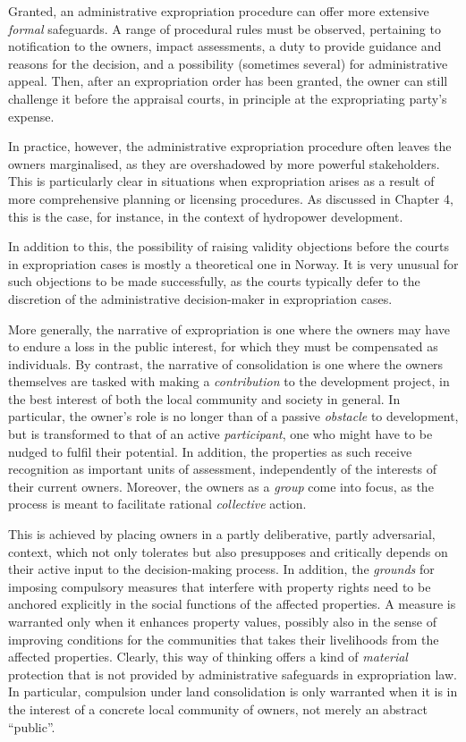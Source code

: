 Granted, an administrative expropriation procedure can offer more extensive {\it formal} safeguards. A range of procedural rules must be observed, pertaining to notification to the owners, impact assessments, a duty to provide guidance and reasons for the decision, and a possibility (sometimes several) for administrative appeal. Then, after an expropriation order has been granted, the owner can still challenge it before the appraisal courts, in principle at the expropriating party's expense. 

In practice, however, the administrative expropriation procedure often leaves the owners marginalised, as they are overshadowed by more powerful stakeholders. This is particularly clear in situations when expropriation arises as a result of more comprehensive planning or licensing procedures. As discussed in Chapter 4, this is the case, for instance, in the context of hydropower development. 

In addition to this, the possibility of raising validity objections before the courts in expropriation cases is mostly a theoretical one in Norway. It is very unusual for such objections to be made successfully, as the courts typically defer to the discretion of the administrative decision-maker in expropriation cases.

More generally, the narrative of expropriation is one where the owners may have to endure a loss in the public interest, for which they must be compensated as individuals. By contrast, the narrative of consolidation is one where the owners themselves are tasked with making a {\it contribution} to the development project, in the best interest of both the local community and society in general. In particular, the owner's role is no longer than of a passive {\it obstacle} to development, but is transformed to that of an active {\it participant}, one who might have to be nudged to fulfil their potential. In addition, the properties as such receive recognition as important units of assessment, independently of the interests of their current owners. Moreover, the owners as a {\it group} come into focus, as the process is meant to facilitate rational {\it collective} action.

This is achieved by placing owners in a partly deliberative, partly adversarial, context, which not only tolerates but also presupposes and critically depends on their active input to the decision-making process. In addition, the {\it grounds} for imposing compulsory measures that interfere with property rights need to be anchored explicitly in the social functions of the affected properties. A measure is warranted only when it enhances property values, possibly also in the sense of improving conditions for the communities that takes their livelihoods from the affected properties. Clearly, this way of thinking  offers a kind of {\it material} protection that is not provided by administrative safeguards in expropriation law. In particular, compulsion under land consolidation is only warranted when it is in the interest of a concrete local community of owners, not merely an abstract ``public''.

